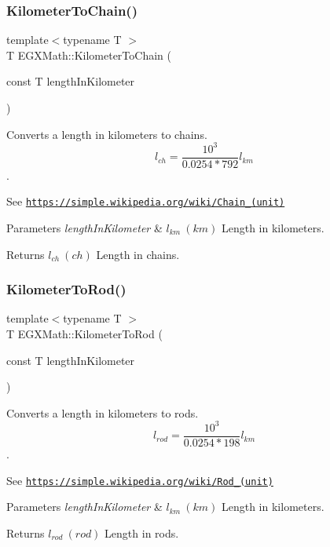 \subsubsection{\texorpdfstring{Kilometer\+To\+Chain()}{KilometerToChain()}}
{\footnotesize\ttfamily template$<$typename T $>$ \\
T E\+G\+X\+Math\+::\+Kilometer\+To\+Chain (\begin{DoxyParamCaption}\item[{const T}]{length\+In\+Kilometer }\end{DoxyParamCaption})}



Converts a length in kilometers to chains. \[ l_{ch}= \frac{10^{3}}{0.0254 * 792} l_{km} \]. 

See \href{https://simple.wikipedia.org/wiki/Chain_(unit)}{\tt https\+://simple.\+wikipedia.\+org/wiki/\+Chain\+\_\+(unit)} 
\begin{DoxyParams}{Parameters}
{\em length\+In\+Kilometer} & $ l_{km}\ (km)$ Length in kilometers. \\
\hline
\end{DoxyParams}
\begin{DoxyReturn}{Returns}
$ l_{ch}\ (ch)$ Length in chains. 
\end{DoxyReturn}
\mbox{\label{group___e_g_x_math-_conversions-_length_conversions-_kilometer-_surveyors_gae57f6033d241f64aa645a42bfe354567}} 
\subsubsection{\texorpdfstring{Kilometer\+To\+Rod()}{KilometerToRod()}}
{\footnotesize\ttfamily template$<$typename T $>$ \\
T E\+G\+X\+Math\+::\+Kilometer\+To\+Rod (\begin{DoxyParamCaption}\item[{const T}]{length\+In\+Kilometer }\end{DoxyParamCaption})}



Converts a length in kilometers to rods. \[ l_{rod}= \frac{10^{3}}{0.0254 * 198} l_{km} \]. 

See \href{https://simple.wikipedia.org/wiki/Rod_(unit)}{\tt https\+://simple.\+wikipedia.\+org/wiki/\+Rod\+\_\+(unit)} 
\begin{DoxyParams}{Parameters}
{\em length\+In\+Kilometer} & $ l_{km}\ (km)$ Length in kilometers. \\
\hline
\end{DoxyParams}
\begin{DoxyReturn}{Returns}
$ l_{rod}\ (rod)$ Length in rods. 
\end{DoxyReturn}
